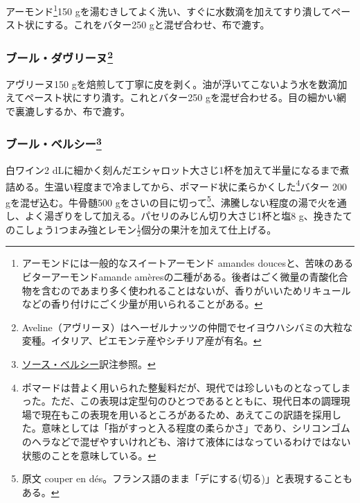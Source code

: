 \begin{recette}
アーモンド\footnote{アーモンドには一般的なスイートアーモンド amandes
  doucesと、苦味のあるビターアーモンドamande
  amèresの二種がある。後者はごく微量の青酸化合物を含むのであまり多く使われることはないが、香りがいいためリキュールなどの香り付けにごく少量が用いられることがある。}150
gを湯むきしてよく洗い、すぐに水数滴を加えてすり潰してペースト状にする。これをバター250
gと混ぜ合わせ、布で漉す。

\hypertarget{beurre-d-aveline}{%
\subsubsection[ブール・ダヴリーヌ]{\texorpdfstring{ブール・ダヴリーヌ\footnote{Aveline（アヴリーヌ）はヘーゼルナッツの仲間でセイヨウハシバミの大粒な変種。イタリア、ピエモンテ産やシチリア産が有名。}}{ブール・ダヴリーヌ}}\label{beurre-d-aveline}}



アヴリーヌ150
gを焙煎して丁寧に皮を剥く。油が浮いてこないよう水を数滴加えてペースト状にすり潰す。これとバター250
gを混ぜ合わせる。目の細かい網で裏漉しするか、布で漉す。

\hypertarget{beurre-bercy}{%
\subsubsection[ブール・ベルシー]{\texorpdfstring{ブール・ベルシー\footnote{\protect\hyperlink{sauce-bercy}{ソース・ベルシー}訳注参照。}}{ブール・ベルシー}}\label{beurre-bercy}}



白ワイン2
dLに細かく刻んだエシャロット大さじ1杯を加えて半量になるまで煮詰める。生温い程度まで冷ましてから、ポマード状に柔らかくした\footnote{ポマードは昔よく用いられた整髪料だが、現代では珍しいものとなってしまった。ただ、この表現は定型句のひとつであるとともに、現代日本の調理現場で現在もこの表現を用いるところがあるため、あえてこの訳語を採用した。意味としては「指がすっと入る程度の柔らかさ」であり、シリコンゴムのヘラなどで混ぜやすいけれども、溶けて液体にはなっているわけではない状態のことを意味している。}バター
200 gを混ぜ込む。牛骨髄500 gをさいの目に切って\footnote{原文 couper en
  dés。フランス語のまま「デにする(切る)」と表現することもある。}、沸騰しない程度の湯で火を通し、よく湯ぎりをして加える。パセリのみじん切り大さじ1杯と塩8
g、挽きたてのこしょう1つまみ強とレモン\(\frac{1}{2}\)個分の果汁を加えて仕上げる。


\end{recette}
